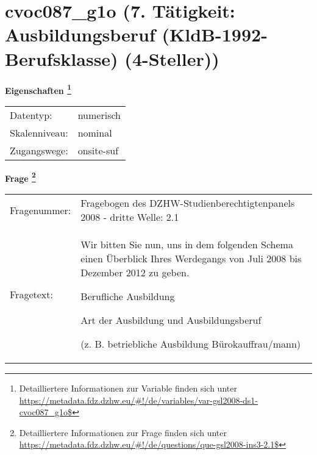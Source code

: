 
    \setcounter{footnote}{0}

    \vspace*{-1.8cm}
	\section{cvoc087\_g1o (7. Tätigkeit: Ausbildungsberuf (KldB-1992-Berufsklasse) (4-Steller))}
	\label{section:cvoc087_g1o}



    \vspace*{0.5cm}
    \noindent\textbf{Eigenschaften
	\footnote{Detailliertere Informationen zur Variable finden sich unter
		\url{https://metadata.fdz.dzhw.eu/\#!/de/variables/var-gsl2008-ds1-cvoc087_g1o$}}}\\
	\begin{tabularx}{\hsize}{@{}lX}
	Datentyp: & numerisch \\
	Skalenniveau: & nominal \\
	Zugangswege: &
	  onsite-suf
 \\
    \end{tabularx}



				\vspace*{0.5cm}
                \noindent\textbf{Frage
	                \footnote{Detailliertere Informationen zur Frage finden sich unter
		              \url{https://metadata.fdz.dzhw.eu/\#!/de/questions/que-gsl2008-ins3-2.1$}}}\\
				\begin{tabularx}{\hsize}{@{}lX}
					Fragenummer: &
					  Fragebogen des DZHW-Studienberechtigtenpanels 2008 - dritte Welle:
					  2.1
 \\
					Fragetext: & Wir bitten Sie nun, uns in dem folgenden Schema einen Überblick Ihres Werdegangs von Juli 2008 bis Dezember 2012 zu geben.\par  Berufliche Ausbildung\par  Art der Ausbildung und Ausbildungsberuf\par  (z. B. betriebliche Ausbildung Bürokauffrau/mann) \\
				\end{tabularx}





